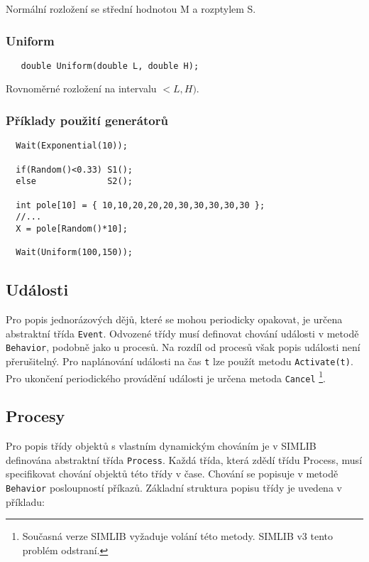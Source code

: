 \documentclass[a4paper]{article}
\begin{document}
Normální rozložení se střední hodnotou  M  a rozptylem  S.

\subsubsection{Uniform}

\begin{verbatim}
   double Uniform(double L, double H);
\end{verbatim}

Rovnoměrné rozložení na intervalu $<L,H)$.


\subsubsection{Příklady použití generátorů}

\begin{verbatim}
  Wait(Exponential(10));

  if(Random()<0.33) S1();
  else              S2();

  int pole[10] = { 10,10,20,20,20,30,30,30,30,30 };
  //...
  X = pole[Random()*10];

  Wait(Uniform(100,150));
\end{verbatim}



\subsection{Události}

Pro popis jednorázových dějů, které se mohou periodicky
opakovat, je určena abstraktní třída \verb|Event|. Odvozené třídy
musí definovat chování události v metodě
\verb|Behavior|, podobně jako u procesů. Na rozdíl od procesů však
popis události není přerušitelný. Pro naplánování události na
čas \verb|t| lze použít metodu \verb|Activate(t)|.
Pro ukončení periodického provádění události je určena metoda \verb|Cancel|
\footnote{
Současná verze SIMLIB vyžaduje volání této metody. SIMLIB v3 tento problém
odstraní.
}.



\subsection{Procesy}

Pro popis třídy objektů s vlastním dynamickým chováním je
v SIMLIB definována abstraktní třída \verb|Process|. Každá třída, která
zdědí třídu Process, musí specifikovat chování objektů této
třídy v čase. Chování se popisuje v metodě \verb|Behavior| posloupností
příkazů. Základní struktura popisu třídy je uvedena v příkladu:
\end{document}
